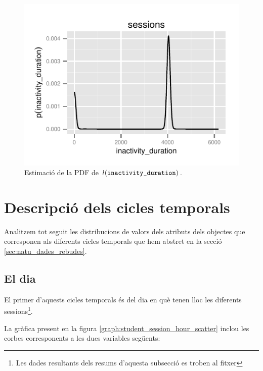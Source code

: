 \documentclass[
	a4paper,
	twoside,
	justified
]{tufte-book}
\begin{document}
\begin{figure}
\begin{center}
\includegraphics{inactivity_duration_a_dens}
\caption{
	\label{graph:inactivity_duration_dens}
	Estimació de la PDF de $l(\texttt{inactivity\_duration})$. 
}
\end{center}
\end{figure}

\section{Descripció dels cicles temporals}

Analitzem tot seguit les distribucions de valors dels atributs dels objectes que corresponen als diferents cicles temporals que hem abstret en la secció \ref{sec:natu_dades_rebudes}.  

\subsection{El dia}

El primer d'aquests cicles temporals és del dia en què tenen lloc les diferents sessions\footnote{Les dades resultants dels resums d'aquesta subsecció es troben al fitxer }.

La gràfica present en la figura \ref{graph:student_session_hour_scatter} inclou les corbes corresponents a les dues variables següents:
\end{document}
